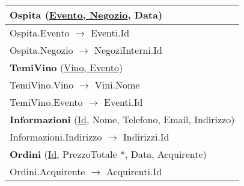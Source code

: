 \begin{center}
\begin{minipage}[t]{7.5cm}
{\begin{tabular}{P{7.5cm}}
				\midrule
				 \textbf{Ospita} (\underline{Evento, Negozio}, Data)                                  \\
				\midrule
				Ospita.Evento $\to$ Eventi.Id                                                                                         \\
				\midrule
				Ospita.Negozio $\to$ NegoziInterni.Id                                                                                 \\                                
				\midrule
				 \textbf{TemiVino} (\underline{Vino, Evento})                                         \\
				\midrule
				TemiVino.Vino $\to$ Vini.Nome                                                                                         \\
				\midrule
				TemiVino.Evento $\to$ Eventi.Id                                                                                       \\                                
				\midrule
				 \textbf{Informazioni} (\underline{Id}, Nome, Telefono, Email, Indirizzo)                                              \\
				\midrule
				Informazioni.Indirizzo $\to$ Indirizzi.Id                                                                                                              \\        
				\midrule
				 \textbf{Ordini} (\underline{Id}, PrezzoTotale *, Data, Acquirente)                                                    \\
				\midrule
				Ordini.Acquirente $\to$ Acquirenti.Id                                                                                                                  \\                                
				\midrule
				

\end{tabular}}
\end{minipage}
\end{center}
